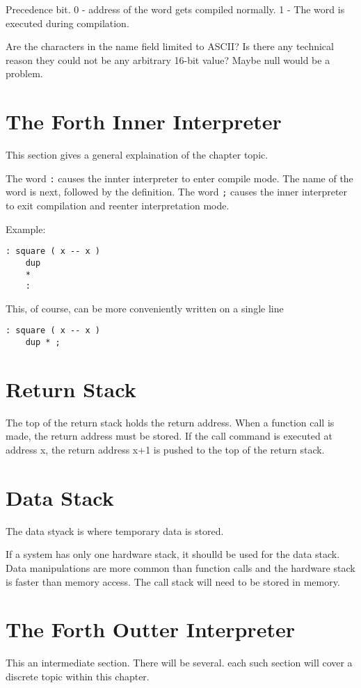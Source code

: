 Precedence bit. 0 - address of the word gets compiled normally. 1 - The word is executed 
during compilation.

Are the characters in the name field limited to ASCII? Is there any technical reason they
could not be any arbitrary 16-bit value? Maybe null would be a problem.

%
\section{The Forth Inner Interpreter}
This section gives a general explaination 
of the chapter topic.

The word \lstinline|:| causes the innter interpreter to enter compile mode. The name of the
word is next, followed by the definition. The word \lstinline|;| causes the inner
interpreter to exit compilation and reenter interpretation mode.

Example:
\begin{lstlisting}[caption={Definition of \lstinline|dup| in Forth.}]
: square ( x -- x )
    dup
    *
    :
\end{lstlisting}

This, of course, can be more conveniently written on a single line
\begin{lstlisting}[style=kaolstplain,linewidth=1.5\textwidth]
: square ( x -- x )
    dup * ;
\end{lstlisting}

\section{Return Stack}
The top of the return stack holds the return address. When a function call is made, the return address
must be stored.  If the call command is executed at address x, the return address x+1 is pushed to the top of the return stack.

\section{Data Stack}
The data styack is where temporary data is stored.

If a system has only one hardware stack, it shoulld be used for the data stack. Data 
manipulations are more common than function calls and the hardware stack is faster 
than memory access. The call stack will need to be stored in memory.

%
\section{The Forth Outter Interpreter}
This an intermediate section. There will be several. each such section will cover a
discrete topic within this chapter.


\blindtext

